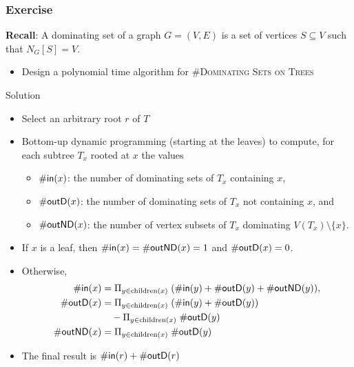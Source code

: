 \begin{frame}
 \frametitle{Exercise}
 
  \noindent
 	\textbf{Recall}: A \alert{dominating set} of a graph $G=(V,E)$ is a set of vertices $S\subseteq V$ such that $N_G[S]=V$.
 	
        
        \begin{itemize}
         \item Design a polynomial time algorithm for \#\textsc{Dominating Sets on Trees}
        \end{itemize}

\end{frame}


\begin{frame}{Solution}
	\begin{itemize}
		\item Select an arbitrary root $r$ of $T$
		\item Bottom-up dynamic programming (starting at the leaves) to compute, for each subtree $T_x$ rooted at $x$ the values
		\begin{itemize}
			\item $\mathsf{\#in}(x)$: the number of dominating sets of $T_x$ containing $x$,
			\item $\mathsf{\#outD}(x)$: the number of dominating sets of $T_x$ not containing $x$, and
			\item $\mathsf{\#outND}(x)$: the number of vertex subsets of $T_x$ dominating $V(T_x)\setminus \{x\}$.
		\end{itemize}
		\item If $x$ is a leaf, then $\mathsf{\#in}(x)=\mathsf{\#outND}(x)=1$ and $\mathsf{\#outD}(x)=0$.
		\item Otherwise, 
		\begin{align*}
		 \mathsf{\#in}(x) &= \Pi_{y \in \text{children} (x)} \; (\mathsf{\#in}(y)+\mathsf{\#outD}(y)+\mathsf{\#outND}(y)),\\
		 \mathsf{\#outD}(x) &= \Pi_{y \in \text{children} (x)} \; (\mathsf{\#in}(y)+\mathsf{\#outD}(y))\\ &\quad - \Pi_{y \in \text{children} (x)} \; \mathsf{\#outD}(y)\\
		 \mathsf{\#outND}(x) &= \Pi_{y \in \text{children} (x)} \; \mathsf{\#outD}(y)
		\end{align*}
		\item The final result is $\mathsf{\#in}(r)+\mathsf{\#outD}(r)$
	\end{itemize}
\end{frame}

